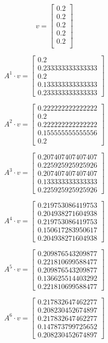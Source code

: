 \documentclass{article}
\begin{document}
        $$v = \begin{bmatrix}
0.2\\
0.2\\
0.2\\
0.2\\
0.2\\
\end{bmatrix}
$$

    $$A^{1} \cdot v = \begin{bmatrix}
0.2\\
0.233333333333333\\
0.2\\
0.133333333333333\\
0.233333333333333
\end{bmatrix}
$$

$$A^{2} \cdot v = \begin{bmatrix}
0.222222222222222\\
0.2\\
0.222222222222222\\
0.155555555555556\\
0.2
\end{bmatrix}
$$

$$A^{3} \cdot v = \begin{bmatrix}
0.207407407407407\\
0.225925925925926\\
0.207407407407407\\
0.133333333333333\\
0.225925925925926
\end{bmatrix}
$$

$$A^{4} \cdot v = \begin{bmatrix}
0.219753086419753\\
0.204938271604938\\
0.219753086419753\\
0.150617283950617\\
0.204938271604938
\end{bmatrix}
$$

$$A^{5} \cdot v = \begin{bmatrix}
0.209876543209877\\
0.221810699588477\\
0.209876543209877\\
0.136625514403292\\
0.221810699588477
\end{bmatrix}
$$

$$A^{6} \cdot v = \begin{bmatrix}
0.217832647462277\\
0.208230452674897\\
0.217832647462277\\
0.147873799725652\\
0.208230452674897
\end{bmatrix}
$$
\end{document}
